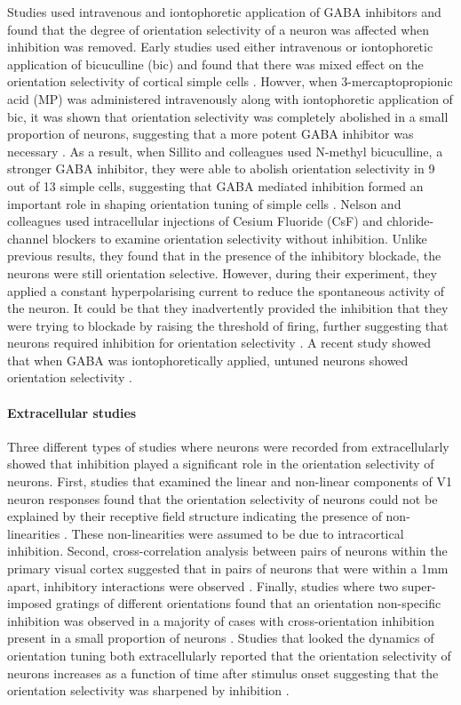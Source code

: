 Studies used intravenous and iontophoretic application of GABA inhibitors and found that the degree of orientation selectivity of a neuron was affected when inhibition was removed. Early studies used either intravenous or iontophoretic application of bicuculline (bic) and found that there was mixed effect on the orientation selectivity of cortical simple cells \cite{Pettigrew1973, Sillito1975}. Howver, when 3-mercaptopropionic acid (MP) was administered intravenously along with iontophoretic application of bic, it was shown that orientation selectivity was completely abolished in a small proportion of neurons, suggesting that a more potent GABA inhibitor was necessary \cite{Tsumoto1979}. As a result, when Sillito and colleagues used N-methyl bicuculline, a stronger GABA inhibitor, they were able to abolish orientation selectivity in 9 out of 13 simple cells, suggesting that GABA mediated inhibition formed an important role in  shaping orientation tuning of simple cells \cite{Sillito1980}. Nelson and colleagues used intracellular injections of Cesium Fluoride (CsF) and chloride-channel blockers to examine orientation selectivity without inhibition. Unlike previous results, they found that in the presence of the inhibitory blockade, the neurons were still orientation selective. However, during their experiment, they applied a constant hyperpolarising current to reduce the spontaneous activity of the neuron. It could be that they inadvertently provided the inhibition that they were trying to blockade by raising the threshold of firing, further suggesting that neurons required inhibition for orientation selectivity \cite{Nelson1994}. A recent study showed that when GABA was iontophoretically applied, untuned neurons showed orientation selectivity \cite{Li2008}.

\paragraph{Extracellular studies}

Three different types of studies where neurons were recorded from extracellularly showed that inhibition played a significant role in the orientation selectivity of neurons. First, studies that examined the linear and non-linear components of V1 neuron responses found that the orientation selectivity of neurons could not be explained by their receptive field structure indicating the presence of non-linearities \cite{Watkins1974, Gardner1999}. These non-linearities were assumed to be due to intracortical inhibition. Second, cross-correlation analysis between pairs of neurons within the primary visual cortex suggested that in pairs of neurons that were within a 1mm apart, inhibitory interactions were observed \cite{Hata1988}. Finally, studies where two super-imposed gratings of different orientations found that an orientation non-specific inhibition was observed in a majority of cases with cross-orientation inhibition present in a small proportion of neurons \cite{Bonds1989}. Studies that looked the dynamics of orientation tuning both extracellularly reported that the orientation selectivity of neurons increases as a function of time after stimulus onset suggesting that the orientation selectivity was sharpened by inhibition \cite{Shapley2003}.

